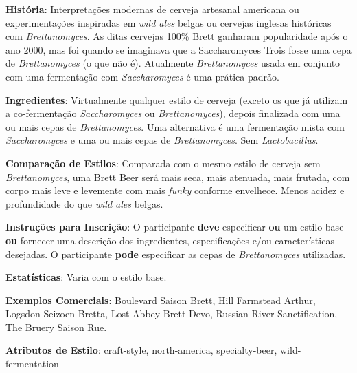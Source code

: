 \textbf{História}: Interpretações modernas de cerveja artesanal americana ou experimentações inspiradas em \textit{wild ales} belgas ou cervejas inglesas históricas com \textit{Brettanomyces}. As ditas cervejas 100\% Brett ganharam popularidade após o ano 2000, mas foi quando se imaginava que a Saccharomyces Trois fosse uma cepa de \textit{Brettanomyces} (o que não é). Atualmente \textit{Brettanomyces} usada em conjunto com uma fermentação com \textit{Saccharomyces} é uma prática padrão.

\textbf{Ingredientes}: Virtualmente qualquer estilo de cerveja (exceto os que já utilizam a co-fermentação \textit{Saccharomyces} ou \textit{Brettanomyces}), depois finalizada com uma ou mais cepas de \textit{Brettanomyces}. Uma alternativa é uma fermentação mista com \textit{Saccharomyces} e uma ou mais cepas de \textit{Brettanomyces}. Sem \textit{Lactobacillus}.

\textbf{Comparação de Estilos}: Comparada com o mesmo estilo de cerveja sem \textit{Brettanomyces}, uma Brett Beer será mais seca, mais atenuada, mais frutada, com corpo mais leve e levemente com mais \textit{funky} conforme envelhece. Menos acidez e profundidade do que \textit{wild ales} belgas.

\textbf{Instruções para Inscrição}: O participante \textbf{deve} especificar \textbf{ou} um estilo base \textbf{ou} fornecer uma descrição dos ingredientes, especificações e/ou características desejadas. O participante \textbf{pode} especificar as cepas de \textit{Brettanomyces} utilizadas.

\textbf{Estatísticas}: Varia com o estilo base.

\textbf{Exemplos Comerciais}: Boulevard Saison Brett, Hill Farmstead Arthur, Logsdon Seizoen Bretta, Lost Abbey Brett Devo, Russian River Sanctification, The Bruery Saison Rue.

\textbf{Atributos de Estilo}: craft-style, north-america, specialty-beer, wild-fermentation

